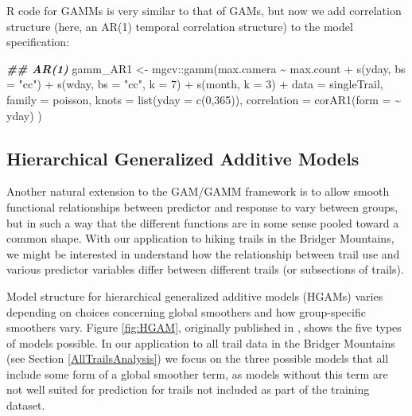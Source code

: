 \documentclass[
]{book}
\newenvironment{Shaded}{\begin{snugshade}}{\end{snugshade}}
\newcommand{\AttributeTok}[1]{\textcolor[rgb]{0.77,0.63,0.00}{#1}}
\newcommand{\DecValTok}[1]{\textcolor[rgb]{0.00,0.00,0.81}{#1}}
\newcommand{\DocumentationTok}[1]{\textcolor[rgb]{0.56,0.35,0.01}{\textbf{\textit{#1}}}}
\newcommand{\FunctionTok}[1]{\textcolor[rgb]{0.00,0.00,0.00}{#1}}
\newcommand{\NormalTok}[1]{#1}
\newcommand{\OtherTok}[1]{\textcolor[rgb]{0.56,0.35,0.01}{#1}}
\newcommand{\SpecialCharTok}[1]{\textcolor[rgb]{0.00,0.00,0.00}{#1}}
\newcommand{\StringTok}[1]{\textcolor[rgb]{0.31,0.60,0.02}{#1}}
\begin{document}
R code for GAMMs is very similar to that of GAMs, but now we add
correlation structure (here, an AR(1) temporal correlation structure) to
the model specification:

\begin{Shaded}
\begin{Highlighting}[]
 \DocumentationTok{\#\# AR(1)}
\NormalTok{gamm\_AR1 }\OtherTok{\textless{}{-}}\NormalTok{ mgcv}\SpecialCharTok{::}\FunctionTok{gamm}\NormalTok{(max.camera }\SpecialCharTok{\textasciitilde{}}\NormalTok{ max.count }\SpecialCharTok{+}
                         \FunctionTok{s}\NormalTok{(yday, }\AttributeTok{bs =} \StringTok{"cc"}\NormalTok{) }\SpecialCharTok{+}
                         \FunctionTok{s}\NormalTok{(wday, }
                           \AttributeTok{bs =} \StringTok{"cc"}\NormalTok{, }\AttributeTok{k =} \DecValTok{7}\NormalTok{) }\SpecialCharTok{+}
                         \FunctionTok{s}\NormalTok{(month, }\AttributeTok{k =} \DecValTok{3}\NormalTok{) }\SpecialCharTok{+}
                         \AttributeTok{data =}\NormalTok{ singleTrail, }
                       \AttributeTok{family =}\NormalTok{ poisson,}
                       \AttributeTok{knots =} \FunctionTok{list}\NormalTok{(}\AttributeTok{yday =} \FunctionTok{c}\NormalTok{(}\DecValTok{0}\NormalTok{,}\DecValTok{365}\NormalTok{)),}
                       \AttributeTok{correlation =} \FunctionTok{corAR1}\NormalTok{(}\AttributeTok{form =} \SpecialCharTok{\textasciitilde{}}\NormalTok{ yday)}
\NormalTok{)}
\end{Highlighting}
\end{Shaded}

\hypertarget{hierarchical-generalized-additive-models}{%
\subsection{Hierarchical Generalized Additive Models}\label{hierarchical-generalized-additive-models}}

Another natural extension to the GAM/GAMM framework is to allow smooth
functional relationships between predictor and response to vary between
groups, but in such a way that the different functions are in some sense
pooled toward a common shape. With our application to hiking trails in
the Bridger Mountains, we might be interested in understand how the
relationship between trail use and various predictor variables differ
between different trails (or subsections of trails).

Model structure for hierarchical generalized additive models (HGAMs)
varies depending on choices concerning global smoothers and how
group-specific smoothers vary. Figure \ref{fig:HGAM}, originally
published in \citet{pedersen2019hierarchical}, shows the five types of models
possible. In our application to all trail data in the Bridger Mountains
(see Section \ref{AllTrailsAnalysis}) we focus on the three possible
models that all include some form of a global smoother term, as models
without this term are not well suited for prediction for trails not
included as part of the training dataset.
\end{document}
